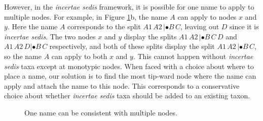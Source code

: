 \documentclass[english]{article}
\begin{document}
However, in the \emph{incertae sedis} framework, it is possible for
one name to apply to multiple nodes.
For example, in Figure \ref{fig:One-name-can}b, 
the name $A$ can apply to nodes $x$ and $y$.
Here the
name $A$ corresponds to the split $A1\,A2\,|\bullet B\,C$, leaving out
$D$ since it is \emph{incertae sedis}.
The two nodes $x$ and $y$
display the splits $A1\,A2\,|\bullet B\,C\,D$ and $A1\,A2\,D|\bullet
B\,C$ respectively, and both of these splits display the split
$A1\,A2\,|\bullet B\,C$, so the name $A$ can apply to both $x$ and
$y$.
This cannot happen without\emph{ incertae sedis} taxa except at
monotypic nodes.
When faced with a choice about where to place a name,
our solution is to find the most tip-ward node where the name can
apply and attach the name to this node.
This corresponds to a
conservative choice about whether \emph{incertae sedis} taxa should be
added to an existing taxon.
\begin{figure}
\hfill{}
\hfill{}
\hfill{}
\caption{\label{fig:One-name-can}One name can be consistent with multiple nodes.}
\end{figure}
\end{document}
